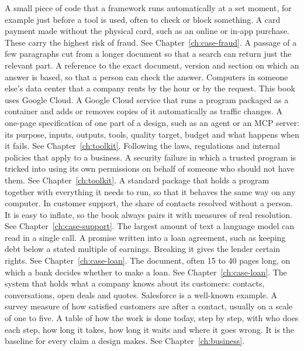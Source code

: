 \begin{description}[style=nextline, leftmargin=1.2em, itemsep=4pt, font=\normalfont\bfseries\sffamily\small]
 A small piece of code that a framework runs automatically at a set moment, for example just before a tool is used, often to check or block something.
 A card payment made without the physical card, such as an online or in-app purchase. These carry the highest risk of fraud. See Chapter~\ref{ch:case-fraud}.
 A passage of a few paragraphs cut from a longer document so that a search can return just the relevant part.
 A reference to the exact document, version and section on which an answer is based, so that a person can check the answer.
 Computers in someone else's data center that a company rents by the hour or by the request. This book uses Google Cloud.
 A Google Cloud service that runs a program packaged as a container and adds or removes copies of it automatically as traffic changes.
 A one-page specification of one part of a design, such as an agent or an MCP server: its purpose, inputs, outputs, tools, quality target, budget and what happens when it fails. See Chapter~\ref{ch:toolkit}.
 Following the laws, regulations and internal policies that apply to a business.
 A security failure in which a trusted program is tricked into using its own permissions on behalf of someone who should not have them. See Chapter~\ref{ch:toolkit}.
 A standard package that holds a program together with everything it needs to run, so that it behaves the same way on any computer.
 In customer support, the share of contacts resolved without a person. It is easy to inflate, so the book always pairs it with measures of real resolution. See Chapter~\ref{ch:case-support}.
 The largest amount of text a language model can read in a single call.
 A promise written into a loan agreement, such as keeping debt below a stated multiple of earnings. Breaking it gives the lender certain rights. See Chapter~\ref{ch:case-loan}.
 The document, often 15 to 40 pages long, on which a bank decides whether to make a loan. See Chapter~\ref{ch:case-loan}.
 The system that holds what a company knows about its customers: contacts, conversations, open deals and quotes. Salesforce is a well-known example.
 A survey measure of how satisfied customers are after a contact, usually on a scale of one to five.
 A table of how the work is done today, step by step, with who does each step, how long it takes, how long it waits and where it goes wrong. It is the baseline for every claim a design makes. See Chapter~\ref{ch:business}.


\end{description}
